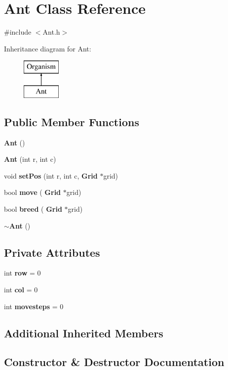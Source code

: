 \section{Ant Class Reference}
\label{classAnt}


{\ttfamily \#include $<$Ant.\+h$>$}

Inheritance diagram for Ant\+:\begin{figure}[H]
\begin{center}
\leavevmode
\includegraphics[height=2.000000cm]{classAnt}
\end{center}
\end{figure}
\subsection*{Public Member Functions}
\begin{DoxyCompactItemize}
\item 
\textbf{ Ant} ()
\item 
\textbf{ Ant} (int r, int c)
\item 
void \textbf{ set\+Pos} (int r, int c, \textbf{ Grid} $\ast$grid)
\item 
bool \textbf{ move} (\textbf{ Grid} $\ast$grid)
\item 
bool \textbf{ breed} (\textbf{ Grid} $\ast$grid)
\item 
\textbf{ $\sim$\+Ant} ()
\end{DoxyCompactItemize}
\subsection*{Private Attributes}
\begin{DoxyCompactItemize}
\item 
int \textbf{ row} = 0
\item 
int \textbf{ col} = 0
\item 
int \textbf{ movesteps} = 0
\end{DoxyCompactItemize}
\subsection*{Additional Inherited Members}


\subsection{Constructor \& Destructor Documentation}
\mbox{\label{classAnt_ad6c1a8f70419877f7a3e2c9c557f913d}} 
